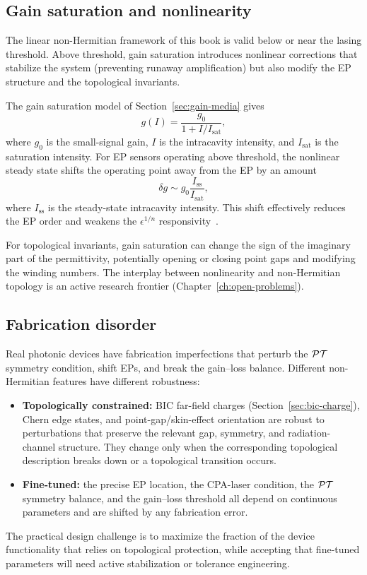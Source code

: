 \subsection{Gain saturation and nonlinearity}
\label{ssec:nonlinearity-limits}

The linear non-Hermitian framework of this book is valid below or near
the lasing threshold. Above threshold, gain saturation introduces
nonlinear corrections that stabilize the system (preventing runaway
amplification) but also modify the EP structure and the topological
invariants.

The gain saturation model of Section~\ref{sec:gain-media} gives
\begin{equation}
 g(I) = \frac{g_0}{1 + I/I_{\mathrm{sat}}},
 \label{eq:gain-saturation-device}
\end{equation}
where $g_0$ is the small-signal gain, $I$ is the intracavity intensity,
and $I_{\mathrm{sat}}$ is the saturation intensity. For EP sensors
operating above threshold, the nonlinear steady state shifts the
operating point away from the EP by an amount
\begin{equation}
 \delta g \sim g_0 \frac{I_{\mathrm{ss}}}{I_{\mathrm{sat}}},
 \label{eq:ep-shift-nonlinear}
\end{equation}
where $I_{\mathrm{ss}}$ is the steady-state intracavity intensity. This
shift effectively reduces the EP order and weakens the $\epsilon^{1/n}$
responsivity~\cite{zheng2024noise}.

For topological invariants, gain saturation can change the sign of the
imaginary part of the permittivity, potentially opening or closing
point gaps and modifying the winding numbers. The interplay between
nonlinearity and non-Hermitian topology is an active research frontier
(Chapter~\ref{ch:open-problems}).

\subsection{Fabrication disorder}
\label{ssec:disorder}

Real photonic devices have fabrication imperfections that perturb the
$\mathcal{PT}$ symmetry condition, shift EPs, and break the gain--loss balance.
Different non-Hermitian features have different robustness:
\begin{itemize}
 \item \textbf{Topologically constrained:} BIC far-field charges
 (Section~\ref{sec:bic-charge}), Chern edge states, and
 point-gap/skin-effect orientation are robust to perturbations that
 preserve the relevant gap, symmetry, and radiation-channel structure.
 They change only when the corresponding topological description breaks
 down or a topological transition occurs.
 \item \textbf{Fine-tuned:} the precise EP location, the CPA-laser
 condition, the $\mathcal{PT}$ symmetry balance, and the gain--loss
 threshold all depend on continuous parameters and are shifted
 by any fabrication error.
\end{itemize}
The practical design challenge is to maximize the fraction of the device
functionality that relies on topological protection, while accepting
that fine-tuned parameters will need active stabilization or tolerance
engineering.

